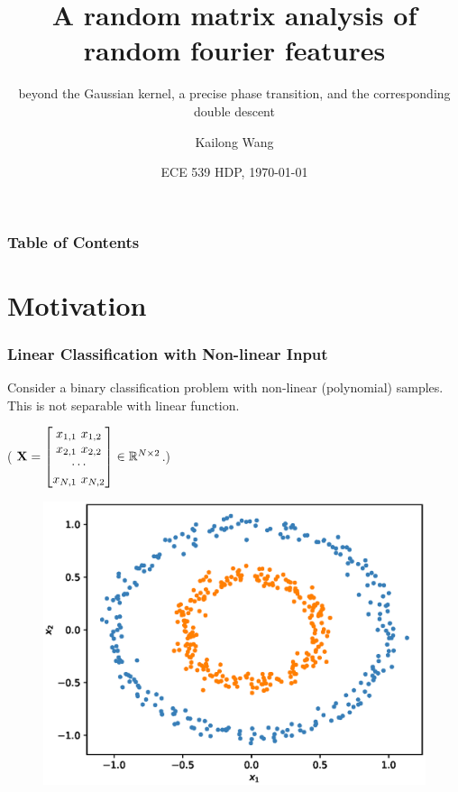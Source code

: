 \documentclass[10pt]{../formats/RU}
\title[Random Fourier Feature]{A random matrix analysis of random fourier features}
\subtitle{beyond the Gaussian kernel, a precise phase transition, and the corresponding double descent}
\author[Kai] %
{Kailong Wang\inst{1}
}
\institute[Rutgers] %
{
  \inst{1}%
  Ph.D.\ of ECE\\
  Rutgers University
}
\date[\today] %
{ECE 539 HDP, \today}
\begin{document}
\frame{\titlepage}
\begin{frame}
\frametitle{Table of Contents}
\tableofcontents
\end{frame}


\section{Motivation}
\begin{frame}
  \frametitle{Linear Classification with Non-linear Input}
  Consider a binary classification problem with non-linear (\eg polynomial) samples. This is not separable with linear function.

  (\eg %
  $\mathbf{X} = {
    \begin{bmatrix}
      x_{1,1} \ x_{1,2} \\
      x_{2,1} \ x_{2,2} \\
      \cdots \\
      x_{N,1} \ x_{N,2}
    \end{bmatrix}
  }\in \mathbb{R}^{N\times 2}$.)
  \begin{figure}
    \includegraphics[height=0.5\textheight]{./figs/2d_poly_circle.eps}%
  \end{figure}
\end{frame}
\end{document}
